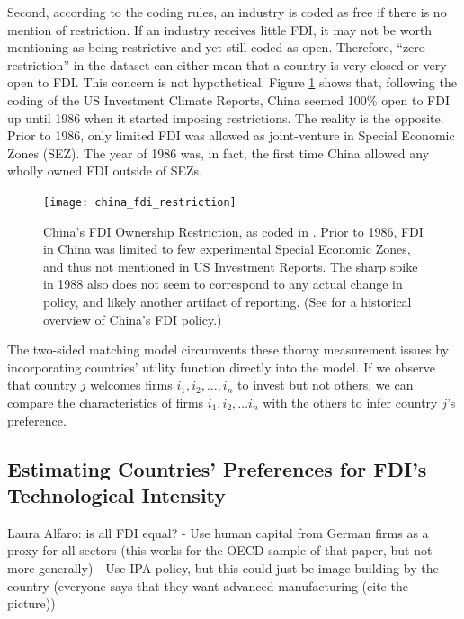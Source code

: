 Second, according to the coding rules, an industry is coded as free if there is
no mention of restriction. If an industry receives little FDI, it may not be
worth mentioning as being restrictive and yet still coded as open. Therefore,
``zero restriction'' in the dataset can either mean that a country is very
closed or very open to FDI. This concern is not hypothetical. Figure
\ref{fig:china_fdi_restriction} shows that, following the coding of the US
Investment Climate Reports, China seemed 100\% open to FDI up until 1986 when it
started imposing restrictions. The reality is the opposite. Prior to 1986, only
limited FDI was allowed as joint-venture in Special Economic Zones (SEZ). The
year of 1986 was, in fact, the first time China allowed any wholly owned FDI
outside of SEZs.

\begin{figure}[!ht] \centering
\texttt{[image: china\_fdi\_restriction]}
\caption{China's FDI Ownership Restriction, as coded in \citet{Pandya2010}.
Prior to 1986, FDI in China was limited to few experimental Special Economic
Zones, and thus not mentioned in US Investment Reports. The sharp spike in 1988
also does not seem to correspond to any actual change in policy, and likely
another artifact of reporting. (See \citet{Zebregs2002} for a historical
overview of China's FDI policy.)}
\label{fig:china_fdi_restriction}
\end{figure}

The two-sided matching model circumvents these thorny measurement issues by
incorporating countries' utility function directly into the model. If we observe
that country $j$ welcomes firms $i_1, i_2, \dots, i_n$ to invest but not others,
we can compare the characteristics of firms $i_1, i_2, \dots i_n$ with the
others to infer country $j$'s preference.


\subsection{Estimating Countries' Preferences for FDI's Technological Intensity}

Laura Alfaro: is all FDI equal? - Use human capital from German firms as a proxy
for all sectors (this works for the OECD sample of that paper, but not more
generally) - Use IPA policy, but this could just be image building by the
country (everyone says that they want advanced manufacturing (cite the picture))

